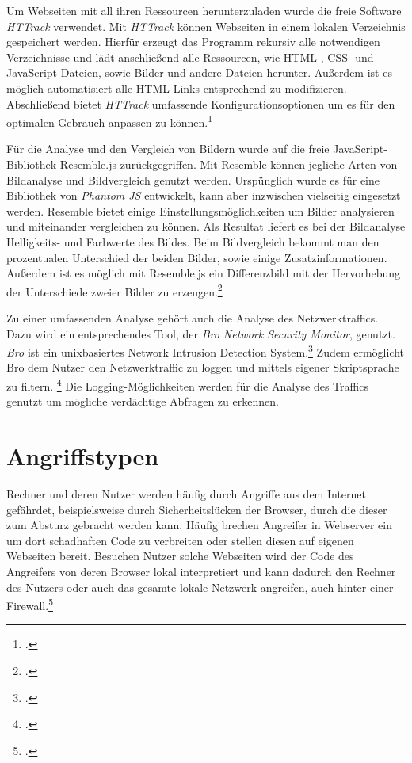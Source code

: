 Um Webseiten mit all ihren Ressourcen herunterzuladen wurde die freie Software \textit{HTTrack}
verwendet. Mit \textit{HTTrack} können Webseiten in einem lokalen Verzeichnis gespeichert werden.
Hierfür erzeugt das Programm rekursiv alle notwendigen Verzeichnisse und lädt anschließend alle
Ressourcen, wie \ac{HTML}-, \ac{CSS}- und JavaScript-Dateien, sowie Bilder und andere Dateien
herunter. Außerdem ist es möglich automatisiert alle \ac{HTML}-Links entsprechend zu modifizieren.
Abschließend bietet \textit{HTTrack} umfassende Konfigurationsoptionen um es für den optimalen
Gebrauch anpassen zu können.\footcite[Vgl.][]{httrack}

Für die Analyse und den Vergleich von Bildern wurde auf die freie JavaScript-Bibliothek Resemble.js
zurückgegriffen. Mit Resemble können jegliche Arten von Bildanalyse und Bildvergleich genutzt
werden. Urspünglich wurde es für eine Bibliothek von \textit{Phantom JS} entwickelt, kann aber
inzwischen vielseitig eingesetzt werden. Resemble bietet einige Einstellungsmöglichkeiten um Bilder
analysieren und miteinander vergleichen zu können. Als Resultat liefert es bei der Bildanalyse
Helligkeits- und Farbwerte des Bildes. Beim Bildvergleich bekommt man den prozentualen Unterschied
der beiden Bilder, sowie einige Zusatzinformationen. Außerdem ist es möglich mit Resemble.js ein
Differenzbild mit der Hervorhebung der Unterschiede zweier Bilder zu erzeugen.\footcite[Vgl.][]{resemblejs}

Zu einer umfassenden Analyse gehört auch die Analyse des Netzwerktraffics. Dazu
wird ein entsprechendes Tool, der \textit{Bro
Network Security Monitor}, genutzt. \textit{Bro} ist ein unixbasiertes Network Intrusion Detection System.\footcite[Vgl.][199]{bro} Zudem
ermöglicht Bro dem Nutzer den Netzwerktraffic zu loggen und mittels eigener Skriptsprache zu filtern. \footcite[Vgl.][]{bro2} Die Logging-Möglichkeiten werden für die Analyse des Traffics genutzt um mögliche verdächtige Abfragen zu erkennen.


\section{Angriffstypen}

Rechner und deren Nutzer werden häufig durch Angriffe aus dem Internet gefährdet, beispielsweise
durch Sicherheitslücken der Browser, durch die dieser zum Absturz gebracht werden kann. Häufig
brechen Angreifer in Webserver ein um dort schadhaften Code zu verbreiten oder stellen diesen auf
eigenen Webseiten bereit. Besuchen Nutzer solche Webseiten wird der Code des Angreifers von deren
Browser lokal interpretiert und kann dadurch den Rechner des Nutzers oder auch das gesamte lokale
Netzwerk angreifen, auch hinter einer Firewall.\footcite[Vgl.][1\psqq]{clientSideAttacks}

